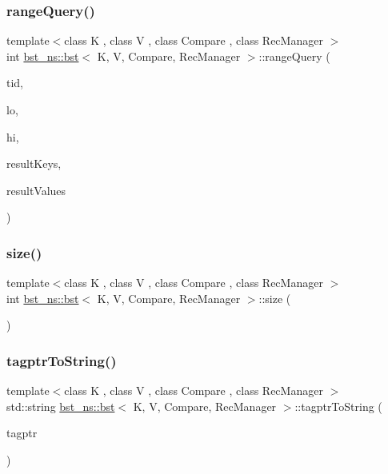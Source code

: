 \subsubsection{\texorpdfstring{range\+Query()}{rangeQuery()}}
{\footnotesize\ttfamily template$<$class K , class V , class Compare , class Rec\+Manager $>$ \\
int \hyperlink{classbst__ns_1_1bst}{bst\+\_\+ns\+::bst}$<$ K, V, Compare, Rec\+Manager $>$\+::range\+Query (\begin{DoxyParamCaption}\item[{const int}]{tid,  }\item[{const K \&}]{lo,  }\item[{const K \&}]{hi,  }\item[{K $\ast$const}]{result\+Keys,  }\item[{V $\ast$const}]{result\+Values }\end{DoxyParamCaption})}

\mbox{\label{classbst__ns_1_1bst_af6d6b7918b5f4417a7462d712b5c4695}} 
\subsubsection{\texorpdfstring{size()}{size()}}
{\footnotesize\ttfamily template$<$class K , class V , class Compare , class Rec\+Manager $>$ \\
int \hyperlink{classbst__ns_1_1bst}{bst\+\_\+ns\+::bst}$<$ K, V, Compare, Rec\+Manager $>$\+::size (\begin{DoxyParamCaption}\item[{void}]{ }\end{DoxyParamCaption})\hspace{0.3cm}{\ttfamily [inline]}}

\mbox{\label{classbst__ns_1_1bst_a147971fbaa7c42d26442240f42f505ef}} 
\subsubsection{\texorpdfstring{tagptr\+To\+String()}{tagptrToString()}}
{\footnotesize\ttfamily template$<$class K , class V , class Compare , class Rec\+Manager $>$ \\
std\+::string \hyperlink{classbst__ns_1_1bst}{bst\+\_\+ns\+::bst}$<$ K, V, Compare, Rec\+Manager $>$\+::tagptr\+To\+String (\begin{DoxyParamCaption}\item[{uintptr\+\_\+t}]{tagptr }\end{DoxyParamCaption})\hspace{0.3cm}{\ttfamily [inline]}}

